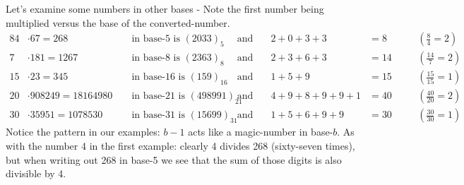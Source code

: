 \documentclass{article}
\begin{document}
Let's examine some numbers
in other bases - Note the first number being multiplied versus the base of the converted-number.
\begin{alignat*}{8}
 4&\cdot{}67=268          &&\text{ in base-5 is } (2033)_5       &&\quad\text{and}\quad &     2+0+3+3&=8  &&\quad(\tfrac{8}{4}=2) \\
 7&\cdot{}181=1267        &&\text{ in base-8 is } (2363)_8       &&\quad\text{and}\quad &     2+3+6+3&=14 &&\quad(\tfrac{14}{7}=2) \\
15&\cdot{}23=345          &&\text{ in base-16 is } (159)_{16}    &&\quad\text{and}\quad &       1+5+9&=15 &&\quad(\tfrac{15}{15}=1) \\
20&\cdot{}908249=18164980 &&\text{ in base-21 is } (498991)_{21} &&\quad\text{and}\quad & 4+9+8+9+9+1&=40 &&\quad(\tfrac{40}{20}=2) \\
30&\cdot{}35951=1078530   &&\text{ in base-31 is } (15699)_{31}  &&\quad\text{and}\quad &   1+5+6+9+9&=30 &&\quad(\tfrac{30}{30}=1)
\end{alignat*}
Notice the pattern in our examples:
$b-1$ acts like a magic-number in base-$b$.
As with the number 4 in the first example:
clearly 4 divides 268 (sixty-seven times),
but when writing out 268 in base-5 we see that the sum of those digits is also divisible by 4.
\end{document}
